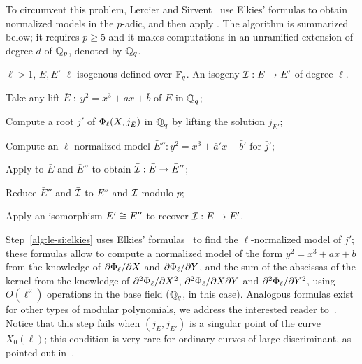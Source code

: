 To circumvent this problem, Lercier and
Sirvent~\cite{lercier+sirvent08} use Elkies' formulas to obtain
normalized models in the $p$-adic, and then apply
. The algorithm is summarized below; it
requires $p\ge5$ and it makes computations in an unramified extension
of degree $d$ of $\mathbb{Q}_p$, denoted by $\mathbb{Q}_q$.

\begin{algorithm*}
  \caption{}
  \label{alg:le-si}
  \begin{algorithmic}[1]
    \REQUIRE $\ell>1$, $E,E'$ $\ell$-isogenous defined over $\mathbb{F}_q$.
    \ENSURE An isogeny $\mathcal{I}:E\rightarrow E'$ of degree $\ell$.

    \STATE \label{alg:le-si:lift1}Take any lift
    $\bar{E}\;:\;y^2=x^3+\bar{a}x+\bar{b}$ of $E$ in $\mathbb{Q}_q$;
    
    \STATE \label{alg:le-si:modpol}Compute a root $\bar{j}'$ of
    $\Phi_\ell(X,j_{\bar{E}})$ in $\mathbb{Q}_q$ by lifting the solution
    $j_{E'}$;
    
    \STATE \label{alg:le-si:elkies} Compute an $\ell$-normalized model
    $\bar{E}'':y^2=x^3+\bar{a}'x+\bar{b}'$ for $\bar{j}'$;
    
    \STATE \label{alg:le-si:bmss}Apply  to $\bar{E}$ and
    $\bar{E}''$ to obtain $\bar{\mathcal{I}}:\bar{E}\rightarrow\bar{E}''$;
    
    \STATE \label{alg:le-si:reduce}Reduce $\bar{E}''$ and $\bar{\mathcal{I}}$
    to $E''$ and $\mathcal{I}$ modulo $p$;
    
    \STATE \label{alg:le-si:isom}Apply an isomorphism $E'\cong E''$ to
    recover $\mathcal{I}:E\rightarrow E'$.
  \end{algorithmic}
\end{algorithm*}

Step~\ref{alg:le-si:elkies} uses Elkies' formulas~\cite{elkies98} to
find the $\ell$-normalized model of $\bar{j}'$; these formulas allow
to compute a normalized model of the form $y^2=x^3+ax+b$ from the
knowledge of $\partial\Phi_\ell/\partial X$ and
$\partial\Phi_\ell/\partial Y$, and the sum of the abscissas of the
kernel from the knowledge of $\partial^2\Phi_\ell/\partial X^2$,
$\partial^2\Phi_\ell/\partial X\partial Y$ and
$\partial^2\Phi_\ell/\partial Y^2$, using $O(\ell^2)$ operations in
the base field ($\mathbb{Q}_q$, in this case). Analogous formulas exist for
other types of modular polynomials, we address the interested reader
to~\cite{schoof95,morain95,elkies98,lercier-algorithmique}. Notice
that this step fails when $(j_E,j_{E'})$ is a singular point of the
curve $X_0(\ell)$; this condition is very rare for ordinary curves of
large discriminant, as pointed out in~\cite[$\S7$]{schoof95}.

